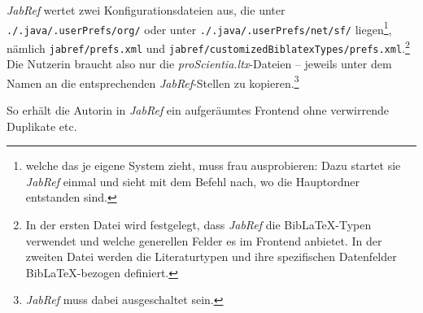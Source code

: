 \emph{JabRef} wertet zwei Konfigurationsdateien aus, die unter \texttt{./.java/.userPrefs/org/} oder unter \texttt{./.java/.userPrefs/net/sf/}  liegen\footnote{welche das je eigene System zieht, muss frau ausprobieren: Dazu startet sie \emph{JabRef} einmal und sieht mit dem Befehl  nach, wo die Hauptordner entstanden sind.}, nämlich \texttt{jabref/prefs.xml} und \texttt{jabref/customizedBiblatexTypes/prefs.xml}.\footnote{In der ersten Datei wird festgelegt, dass \emph{JabRef} die Bib\LaTeX-Typen verwendet und welche generellen Felder es im Frontend anbietet. In der zweiten Datei werden die Literaturtypen und ihre spezifischen Datenfelder Bib\LaTeX-bezogen definiert.} Die Nutzerin braucht also nur die \emph{proScientia.ltx}-Dateien -- jeweils unter dem Namen  an die entsprechenden \emph{JabRef}-Stellen zu kopieren.\footnote{\emph{JabRef} muss dabei ausgeschaltet sein.}

So erhält die Autorin in \emph{JabRef} ein aufgeräumtes Frontend ohne verwirrende Duplikate etc.
%
